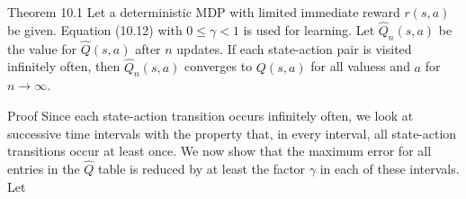 \documentclass[10pt]{book}
\begin{document}
\begin{displayquote}
Theorem 10.1 Let a deterministic MDP with limited immediate reward $r(s, a)$ be given. Equation (10.12) with $0 \leq \gamma<1$ is used for learning. Let $\hat{Q}_{n}(s, a)$ be the value for $\hat{Q}(s, a)$ after $n$ updates. If each state-action pair is visited infinitely often, then $\hat{Q}_{n}(s, a)$ converges to $Q(s, a)$ for all valuess and $a$ for $n \rightarrow \infty$.
\end{displayquote}

Proof Since each state-action transition occurs infinitely often, we look at successive time intervals with the property that, in every interval, all state-action transitions occur at least once. We now show that the maximum error for all entries in the $\hat{Q}$ table is reduced by at least the factor $\gamma$ in each of these intervals. Let
\end{document}
